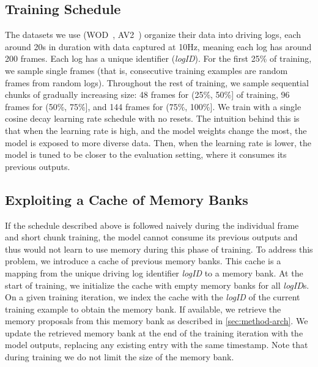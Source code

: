 \subsection{Training Schedule}

The datasets we use (WOD~\cite{WOD}, AV2~\cite{wilson2023argoverse}) organize their data into driving logs, each around 20s in duration with data captured at 10Hz,
meaning each log has around 200 frames.
Each log has a unique identifier (\textit{logID}).
For the first 25\% of training, we sample single frames (that is, consecutive training examples are random frames from random logs).
Throughout the rest of training, we sample sequential chunks of gradually increasing size: 48 frames for (25\%, 50\%] of training,
96 frames for (50\%, 75\%], and 144 frames for (75\%, 100\%].
We train with a single cosine decay learning rate schedule with no resets.
The intuition behind this is that when the learning rate is high, and the model weights change the most, the model is exposed to more diverse data.
Then, when the learning rate is lower, the model is tuned to be closer to the evaluation setting, where it consumes its previous outputs.

\subsection{Exploiting a Cache of Memory Banks}
If the schedule described above is followed naively during the individual frame and short chunk training, the model cannot consume its previous outputs and thus would not learn to use memory during this phase of training.
To address this problem, we introduce a cache of previous memory banks. This cache is a mapping from the unique driving log identifier \textit{logID} to a memory bank. At the start of training, we initialize the cache with empty memory banks for all \textit{logID}s.
On a given training iteration, we index the cache with the \textit{logID} of the current training example to obtain the memory bank.
If available, we retrieve the memory proposals from this memory bank as described in \cref{sec:method-arch}.
We update the retrieved memory bank at the end of the training iteration with the model outputs,
replacing any existing entry with the same timestamp.
Note that during training we do not limit the size of the memory bank.

